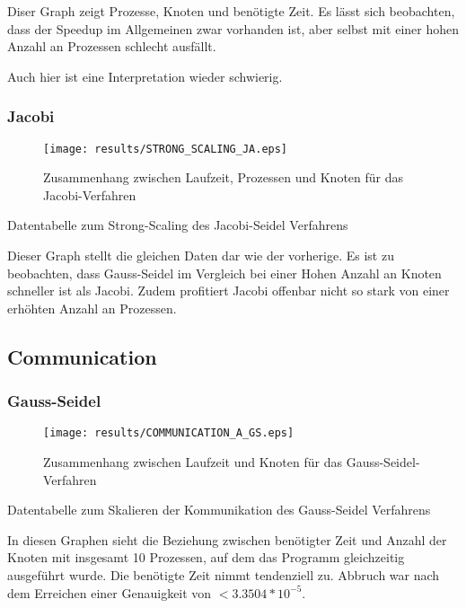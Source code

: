 \documentclass[a4paper,12pt]{scrartcl}
\begin{document}
Diser Graph zeigt Prozesse, Knoten und benötigte Zeit. Es lässt sich
beobachten, dass der Speedup im Allgemeinen zwar vorhanden ist, aber selbst
mit einer hohen Anzahl an Prozessen schlecht ausfällt.

Auch hier ist eine Interpretation wieder schwierig.

\subsubsection{Jacobi}
\begin{figure}[hr!]
\texttt{[image: results/STRONG\_SCALING\_JA.eps]}
 \caption{Zusammenhang zwischen Laufzeit, Prozessen und Knoten für das Jacobi-Verfahren}
\end{figure}
\begin{table}[hl!]

\caption{Datentabelle zum Strong-Scaling des Jacobi-Seidel Verfahrens}
\end{table}

Dieser Graph stellt die gleichen Daten dar wie der vorherige. Es ist zu
beobachten, dass Gauss-Seidel im Vergleich bei einer Hohen Anzahl an Knoten schneller ist als Jacobi.
Zudem profitiert Jacobi offenbar nicht so stark von einer erhöhten Anzahl an Prozessen.
\newpage
\FloatBarrier
\subsection{Communication}
\subsubsection{Gauss-Seidel}
\begin{figure}[hr!]
\texttt{[image: results/COMMUNICATION\_A\_GS.eps]}
 \caption{Zusammenhang zwischen Laufzeit und Knoten für das Gauss-Seidel-Verfahren}
\end{figure}
\begin{table}[hl!]

\caption{Datentabelle zum Skalieren der Kommunikation des Gauss-Seidel Verfahrens}
\end{table}

In diesen Graphen sieht die Beziehung zwischen benötigter Zeit
und Anzahl der Knoten mit insgesamt 10 Prozessen, auf dem das Programm
gleichzeitig ausgeführt wurde. Die benötigte Zeit nimmt tendenziell zu.
Abbruch war nach dem Erreichen einer Genauigkeit von $<3.3504*10^{-5}$.
\end{document}
